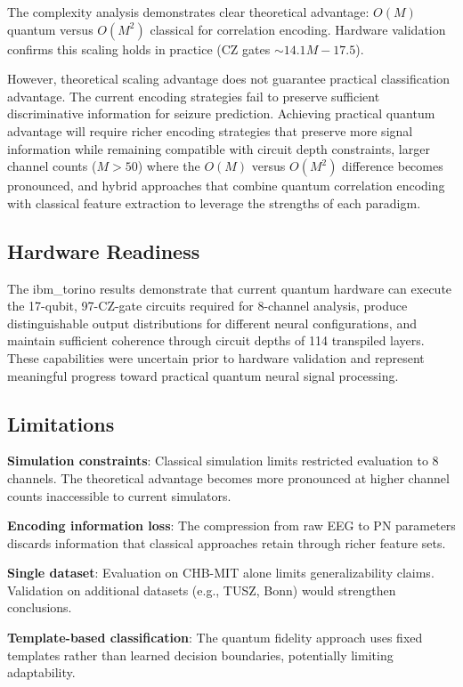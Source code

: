 \documentclass[11pt,a4paper]{article}
\begin{document}
The complexity analysis demonstrates clear theoretical advantage: $O(M)$ quantum versus $O(M^2)$ classical for correlation encoding. Hardware validation confirms this scaling holds in practice (CZ gates $\sim 14.1M - 17.5$).

However, theoretical scaling advantage does not guarantee practical classification advantage. The current encoding strategies fail to preserve sufficient discriminative information for seizure prediction. Achieving practical quantum advantage will require richer encoding strategies that preserve more signal information while remaining compatible with circuit depth constraints, larger channel counts ($M > 50$) where the $O(M)$ versus $O(M^2)$ difference becomes pronounced, and hybrid approaches that combine quantum correlation encoding with classical feature extraction to leverage the strengths of each paradigm.

\subsection{Hardware Readiness}

The ibm\_torino results demonstrate that current quantum hardware can execute the 17-qubit, 97-CZ-gate circuits required for 8-channel analysis, produce distinguishable output distributions for different neural configurations, and maintain sufficient coherence through circuit depths of 114 transpiled layers. These capabilities were uncertain prior to hardware validation and represent meaningful progress toward practical quantum neural signal processing.

\subsection{Limitations}

\textbf{Simulation constraints}: Classical simulation limits restricted evaluation to 8 channels. The theoretical advantage becomes more pronounced at higher channel counts inaccessible to current simulators.

\textbf{Encoding information loss}: The compression from raw EEG to PN parameters discards information that classical approaches retain through richer feature sets.

\textbf{Single dataset}: Evaluation on CHB-MIT alone limits generalizability claims. Validation on additional datasets (e.g., TUSZ, Bonn) would strengthen conclusions.

\textbf{Template-based classification}: The quantum fidelity approach uses fixed templates rather than learned decision boundaries, potentially limiting adaptability.
\end{document}
